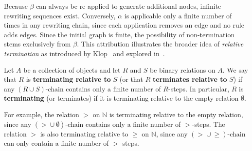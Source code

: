 \begin{center}
{{
            }
        }
            \end{center}
Because $\beta$ can always be re-applied to generate additional nodes, infinite rewriting sequences exist. Conversely, $\alpha$ is applicable only 
a finite number of times in any rewriting chain, since each application removes an edge and no rule adds edges. Since the initial graph is finite, the possibility of non-termination stems exclusively from $\beta$. This attribution illustrates the broader idea of \emph{relative termination} as introduced by Klop~\cite{klop1987term} and explored in~\cite{geser1990relative,kassing2024dependency,endrullis2024generalized_icgt,zantema2014termination,bruggink2014termination,bruggink2015proving}.
\begin{definition}
Let $A$ be a collection of objects and let $R$ and $S$ be binary relations on $A$. 
We say that $R$ is \textbf{terminating relative to} $S$ (or that $R$ \textbf{terminates relative to} $S$) if 
any $(R \mathop{\cup} S)$-chain contains only a finite number of $R$-steps.
In particular, $R$ is \textbf{terminating} (or terminates) if it is terminating relative to the empty relation $\emptyset$.
\end{definition}

For example, the relation $>$ on $\mathbb{N}$ is terminating relative to the empty relation, since any $(\mathop{>} \mathop{\cup} \emptyset)$-chain contains only a finite number of $>$-steps. The relation $>$ is also terminating relative to $\geq$ on $\mathbb{N}$, since any $(\mathop{>} \mathop{\cup} \mathop{\geq})$-chain can only contain a finite number of $>$-steps.


